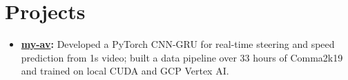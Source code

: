\documentclass[11pt, letterpaper]{article}
\begin{document}
\section{Projects}
\begin{itemize}
  \item \textbf{\href{https://github.com/lordphone/my-av}{my-av}:} Developed a PyTorch CNN-GRU for real-time steering and speed prediction from 1s video; built a data pipeline over 33 hours of Comma2k19 and trained on local CUDA and GCP Vertex AI.
\end{itemize}
\end{document}
